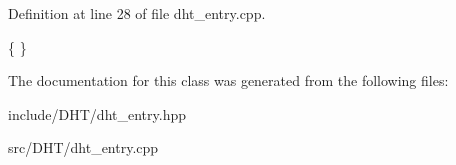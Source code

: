 Definition at line 28 of file dht\-\_\-entry.\-cpp.


\begin{DoxyCode}
\{
\}
\end{DoxyCode}


The documentation for this class was generated from the following files\-:\begin{DoxyCompactItemize}
\item 
include/\-D\-H\-T/dht\-\_\-entry.\-hpp\item 
src/\-D\-H\-T/dht\-\_\-entry.\-cpp\end{DoxyCompactItemize}
